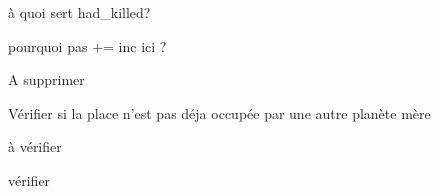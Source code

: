 
\begin{DoxyRefList}
\item[\label{todo__todo000002}%
\hypertarget{todo__todo000002}{}%
Membre \hyperlink{classColonized__planet_a00293269f8b2ce00b45a23d89cb48015}{Colonized\-\_\-planet\-:\-:run} ()]à quoi sert had\-\_\-killed? 

pourquoi pas += inc ici ?  
\item[\label{todo__todo000001}%
\hypertarget{todo__todo000001}{}%
Membre \hyperlink{classDisplayer_a06d6e9b18c26c121d21d95bb5a352ee0}{Displayer\-:\-:afficher\-Rect} ()]A supprimer  
\item[\label{todo__todo000004}%
\hypertarget{todo__todo000004}{}%
Membre \hyperlink{classFaction_a4f7c37fe385ee3a41e875aa23b6a8319}{Faction\-:\-:init} ()]Vérifier si la place n'est pas déja occupée par une autre planète mère  
\item[\label{todo__todo000005}%
\hypertarget{todo__todo000005}{}%
Classe \hyperlink{classNeutral__faction}{Neutral\-\_\-faction} ]à vérifier  
\item[\label{todo__todo000006}%
\hypertarget{todo__todo000006}{}%
Membre \hyperlink{classVirtual__planet_aa5ebb40e5a4ed0a631b120749f938f35}{Virtual\-\_\-planet\-:\-:changed\-\_\-} ]vérifier 
\end{DoxyRefList}